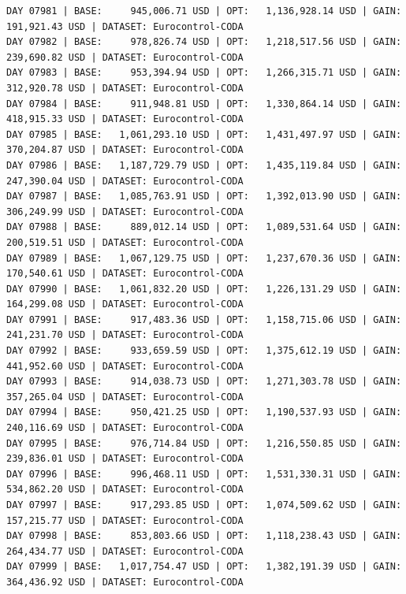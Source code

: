 \documentclass[11pt,a4paper]{article}
\begin{document}
\begin{verbatim}
DAY 07981 | BASE:     945,006.71 USD | OPT:   1,136,928.14 USD | GAIN: 191,921.43 USD | DATASET: Eurocontrol-CODA
DAY 07982 | BASE:     978,826.74 USD | OPT:   1,218,517.56 USD | GAIN: 239,690.82 USD | DATASET: Eurocontrol-CODA
DAY 07983 | BASE:     953,394.94 USD | OPT:   1,266,315.71 USD | GAIN: 312,920.78 USD | DATASET: Eurocontrol-CODA
DAY 07984 | BASE:     911,948.81 USD | OPT:   1,330,864.14 USD | GAIN: 418,915.33 USD | DATASET: Eurocontrol-CODA
DAY 07985 | BASE:   1,061,293.10 USD | OPT:   1,431,497.97 USD | GAIN: 370,204.87 USD | DATASET: Eurocontrol-CODA
DAY 07986 | BASE:   1,187,729.79 USD | OPT:   1,435,119.84 USD | GAIN: 247,390.04 USD | DATASET: Eurocontrol-CODA
DAY 07987 | BASE:   1,085,763.91 USD | OPT:   1,392,013.90 USD | GAIN: 306,249.99 USD | DATASET: Eurocontrol-CODA
DAY 07988 | BASE:     889,012.14 USD | OPT:   1,089,531.64 USD | GAIN: 200,519.51 USD | DATASET: Eurocontrol-CODA
DAY 07989 | BASE:   1,067,129.75 USD | OPT:   1,237,670.36 USD | GAIN: 170,540.61 USD | DATASET: Eurocontrol-CODA
DAY 07990 | BASE:   1,061,832.20 USD | OPT:   1,226,131.29 USD | GAIN: 164,299.08 USD | DATASET: Eurocontrol-CODA
DAY 07991 | BASE:     917,483.36 USD | OPT:   1,158,715.06 USD | GAIN: 241,231.70 USD | DATASET: Eurocontrol-CODA
DAY 07992 | BASE:     933,659.59 USD | OPT:   1,375,612.19 USD | GAIN: 441,952.60 USD | DATASET: Eurocontrol-CODA
DAY 07993 | BASE:     914,038.73 USD | OPT:   1,271,303.78 USD | GAIN: 357,265.04 USD | DATASET: Eurocontrol-CODA
DAY 07994 | BASE:     950,421.25 USD | OPT:   1,190,537.93 USD | GAIN: 240,116.69 USD | DATASET: Eurocontrol-CODA
DAY 07995 | BASE:     976,714.84 USD | OPT:   1,216,550.85 USD | GAIN: 239,836.01 USD | DATASET: Eurocontrol-CODA
DAY 07996 | BASE:     996,468.11 USD | OPT:   1,531,330.31 USD | GAIN: 534,862.20 USD | DATASET: Eurocontrol-CODA
DAY 07997 | BASE:     917,293.85 USD | OPT:   1,074,509.62 USD | GAIN: 157,215.77 USD | DATASET: Eurocontrol-CODA
DAY 07998 | BASE:     853,803.66 USD | OPT:   1,118,238.43 USD | GAIN: 264,434.77 USD | DATASET: Eurocontrol-CODA
DAY 07999 | BASE:   1,017,754.47 USD | OPT:   1,382,191.39 USD | GAIN: 364,436.92 USD | DATASET: Eurocontrol-CODA
\end{verbatim}
\end{document}
